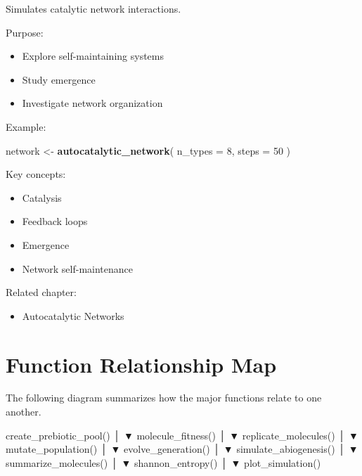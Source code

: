 \documentclass[
  oneside,
  openany]{book}
\newenvironment{Shaded}{\begin{snugshade}}{\end{snugshade}}
\newcommand{\AttributeTok}[1]{\textcolor[rgb]{0.13,0.29,0.53}{#1}}
\newcommand{\DecValTok}[1]{\textcolor[rgb]{0.00,0.00,0.81}{#1}}
\newcommand{\FunctionTok}[1]{\textcolor[rgb]{0.13,0.29,0.53}{\textbf{#1}}}
\newcommand{\NormalTok}[1]{#1}
\newcommand{\OtherTok}[1]{\textcolor[rgb]{0.56,0.35,0.01}{#1}}
\providecommand{\tightlist}{%
  \setlength{\itemsep}{0pt}\setlength{\parskip}{0pt}}
\begin{document}
Simulates catalytic network interactions.

Purpose:

\begin{itemize}
\tightlist
\item
  Explore self-maintaining systems
\item
  Study emergence
\item
  Investigate network organization
\end{itemize}

Example:

\begin{Shaded}
\begin{Highlighting}[]
\NormalTok{network }\OtherTok{\textless{}{-}} \FunctionTok{autocatalytic\_network}\NormalTok{(}
  \AttributeTok{n\_types =} \DecValTok{8}\NormalTok{,}
  \AttributeTok{steps =} \DecValTok{50}
\NormalTok{)}
\end{Highlighting}
\end{Shaded}

Key concepts:

\begin{itemize}
\tightlist
\item
  Catalysis
\item
  Feedback loops
\item
  Emergence
\item
  Network self-maintenance
\end{itemize}

Related chapter:

\begin{itemize}
\tightlist
\item
  Autocatalytic Networks
\end{itemize}

\section{Function Relationship Map}\label{function-relationship-map}

The following diagram summarizes how the major functions relate to one another.

\begin{Shaded}
\begin{Highlighting}[]
\NormalTok{create\_prebiotic\_pool()}
\NormalTok{            │}
\NormalTok{            ▼}
\NormalTok{   molecule\_fitness()}
\NormalTok{            │}
\NormalTok{            ▼}
\NormalTok{ replicate\_molecules()}
\NormalTok{            │}
\NormalTok{            ▼}
\NormalTok{  mutate\_population()}
\NormalTok{            │}
\NormalTok{            ▼}
\NormalTok{  evolve\_generation()}
\NormalTok{            │}
\NormalTok{            ▼}
\NormalTok{ simulate\_abiogenesis()}
\NormalTok{            │}
\NormalTok{            ▼}
\NormalTok{ summarize\_molecules()}
\NormalTok{            │}
\NormalTok{            ▼}
\NormalTok{   shannon\_entropy()}
\NormalTok{            │}
\NormalTok{            ▼}
\NormalTok{   plot\_simulation()}
\end{Highlighting}
\end{Shaded}
\end{document}
